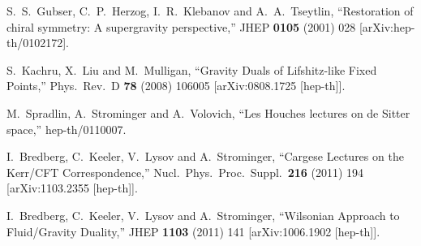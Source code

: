 \begin{thebibliography}{99}

  S.~S.~Gubser, C.~P.~Herzog, I.~R.~Klebanov and A.~A.~Tseytlin,
  ``Restoration of chiral symmetry: A supergravity perspective,''
  JHEP {\bf 0105} (2001) 028
  [arXiv:hep-th/0102172].





  
  S.~Kachru, X.~Liu and M.~Mulligan,
  ``Gravity Duals of Lifshitz-like Fixed Points,''
  Phys.\ Rev.\ D {\bf 78} (2008) 106005
  [arXiv:0808.1725 [hep-th]].


  M.~Spradlin, A.~Strominger and A.~Volovich,
  ``Les Houches lectures on de Sitter space,''
  hep-th/0110007.

  I.~Bredberg, C.~Keeler, V.~Lysov and A.~Strominger,
  ``Cargese Lectures on the Kerr/CFT Correspondence,''
  Nucl.\ Phys.\ Proc.\ Suppl.\  {\bf 216} (2011) 194
  [arXiv:1103.2355 [hep-th]].

  I.~Bredberg, C.~Keeler, V.~Lysov and A.~Strominger,
  ``Wilsonian Approach to Fluid/Gravity Duality,''
  JHEP {\bf 1103} (2011) 141
  [arXiv:1006.1902 [hep-th]].


\end{thebibliography}
